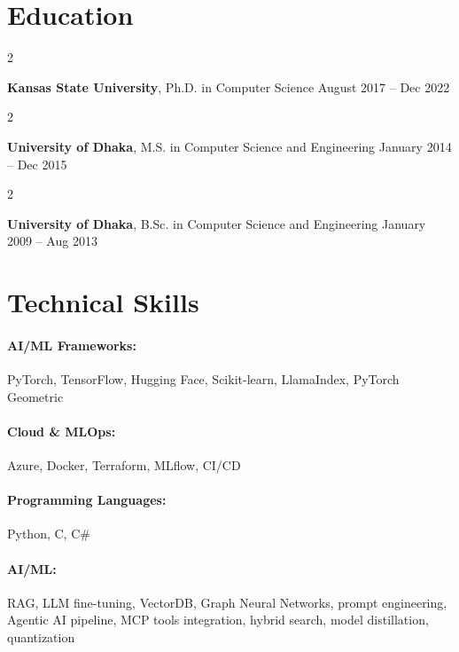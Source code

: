 \documentclass[10pt, letterpaper]{article}
\newenvironment{twocolentry}[2][]{
    \onecolentry
    \def\secondColumn{#2}
    \setcolumnwidth{\fill, 4.5 cm}
    \begin{paracol}{2}
}{
    \switchcolumn \raggedleft \secondColumn
    \end{paracol}
    \endonecolentry
} %
\begin{document}
\section{Education}

        \begin{twocolentry}{
            August 2017 -- Dec 2022
        }
            \textbf{Kansas State University}, Ph.D. in Computer Science\end{twocolentry}

        \begin{twocolentry}{
            January 2014 -- Dec 2015
        }
            \textbf{University of Dhaka}, M.S. in Computer Science and Engineering\end{twocolentry}

        \begin{twocolentry}{
            January 2009 -- Aug 2013
        }
            \textbf{University of Dhaka}, B.Sc. in Computer Science and Engineering\end{twocolentry}

\vspace{-1mm}
\section{Technical Skills}

        \paragraph{AI/ML Frameworks:} PyTorch, TensorFlow, Hugging Face, Scikit-learn, LlamaIndex, PyTorch Geometric
        \vspace{-4mm}
        \paragraph{Cloud \& MLOps:} Azure, Docker, Terraform, MLflow, CI/CD
        \vspace{-4mm}
        \paragraph{Programming Languages:} Python, C, C\#
        \vspace{-4mm}
        \paragraph{AI/ML:} RAG, LLM fine-tuning, VectorDB, Graph Neural Networks, prompt engineering, Agentic AI pipeline, MCP tools integration, hybrid search, model distillation, quantization
\end{document}
